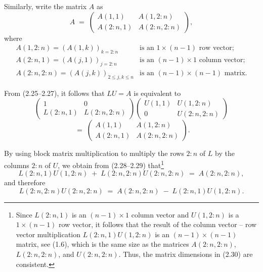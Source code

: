 Similarly, write the matrix $A$ as
\begin{equation}
A \;=\; \begin{pmatrix} A(1,1) & A(1,2:n) \\ A(2:n,1) & A(2:n,2:n)\end{pmatrix},
\end{equation}
where
\[
\begin{array}{ll}
A(1,2:n) = (A(1,k))_{k=2:n} & \text{is an } 1\times(n-1) \text{ row vector;}\\
A(2:n,1) = (A(j,1))_{j=2:n} & \text{is an } (n-1)\times 1 \text{ column vector;}\\
A(2:n,2:n) = (A(j,k))_{2\le j,k\le n} & \text{is an } (n-1)\times(n-1) \text{ matrix.}
\end{array}
\]

From (2.25--2.27), it follows that $LU=A$ is equivalent to
\begin{equation}
\begin{pmatrix} 1 & 0 \\ L(2:n,1) & L(2:n,2:n)\end{pmatrix}
\begin{pmatrix} U(1,1) & U(1,2:n) \\ 0 & U(2:n,2:n)\end{pmatrix}
\end{equation}
\begin{equation}
\;=\; \begin{pmatrix} A(1,1) & A(1,2:n) \\ A(2:n,1) & A(2:n,2:n)\end{pmatrix}.
\end{equation}

By using block matrix multiplication to multiply the rows $2:n$ of $L$
by the columns $2:n$ of $U$, we obtain from (2.28--2.29)
that\footnote{Since $L(2:n,1)$ is an $(n-1)\times 1$ column vector and
$U(1,2:n)$ is a $1\times(n-1)$ row vector, it follows that the result of
the column vector -- row vector multiplication $L(2:n,1)U(1,2:n)$ is an
$(n-1)\times(n-1)$ matrix, see (1.6), which is the same size as the
matrices $A(2:n,2:n)$, $L(2:n,2:n)$, and $U(2:n,2:n)$. Thus, the matrix
dimensions in (2.30) are consistent.}
\begin{equation}
L(2:n,1)U(1,2:n) \;+\; L(2:n,2:n)U(2:n,2:n) \;=\; A(2:n,2:n),
\end{equation}
and therefore
\begin{equation}
L(2:n,2:n)U(2:n,2:n) \;=\; A(2:n,2:n) \;-\; L(2:n,1)U(1,2:n).
\end{equation}

